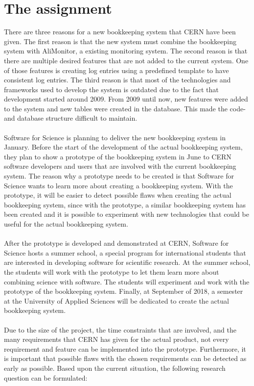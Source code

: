 \documentclass[paper=a4, fontsize=11pt,twoside]{scrartcl}	%
\begin{document}
\newpage
\section{The assignment}
There are three reasons for a new bookkeeping system that CERN have been given. The first reason is that the new system must combine the bookkeeping system with AliMonitor, a existing monitoring system. The second reason is that there are multiple desired features that are not added to the current system. One of those features is creating log entries using a predefined template to have consistent log entries. The third reason is that most of the technologies and frameworks used to develop the system is outdated due to the fact that development started around 2009. From 2009 until now, new features were added to the system and new tables were created in the database. This made the code- and database structure difficult to maintain. \\ \\
Software for Science is planning to deliver the new bookkeeping system in January. Before the start of the development of the actual bookkeeping system, they plan to show a prototype of the bookkeeping system in June to CERN software developers and users that are involved with the current bookkeeping system. The reason why a prototype needs to be created is that Software for Science wants to learn more about creating a bookkeeping system. With the prototype, it will be easier to detect possible flaws when creating the actual bookkeeping system, since with the prototype, a similar bookkeeping system has been created and it is possible to experiment with new technologies that could be useful for the actual bookkeeping system. \\ \\
After the prototype is developed and demonstrated at CERN, Software for Science hosts a summer school, a special program for international students that are interested in developing software for scientific research. At the summer school, the students will work with the prototype to let them learn more about combining science with software. The students will experiment and work with the prototype of the bookkeeping system. Finally, at September of 2018, a semester at the University of Applied Sciences will be dedicated to create the actual bookkeeping system. \\ \\ 
Due to the size of the project, the time constraints that are involved, and the many requirements that CERN has given for the actual product, not every requirement and feature can be implemented into the prototype. Furthermore, it is important that possible flaws with the chosen requirements can be detected as early as possible. Based upon the current situation, the following research question can be formulated: \\ \\
\end{document}
